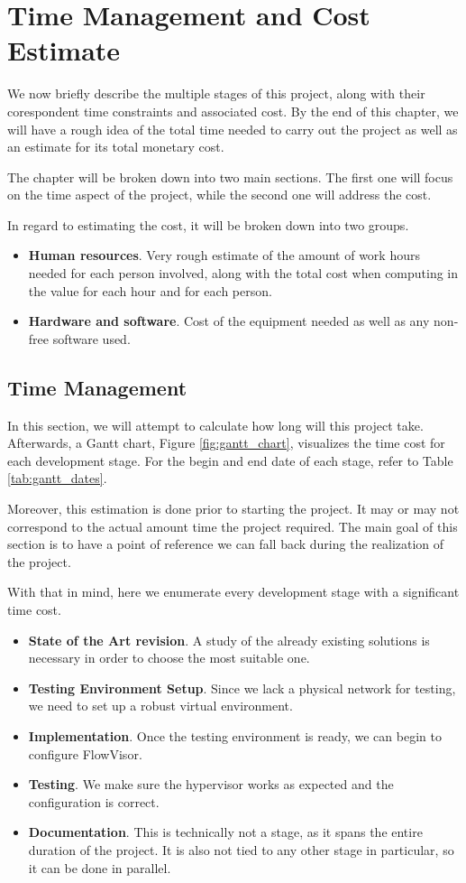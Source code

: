 \chapter{Time Management and Cost Estimate}
We now briefly describe the multiple stages of this project, along with their corespondent time constraints and associated cost. By the end of this chapter, we will have a rough idea of the total time needed to carry out the project as well as an estimate for its total monetary cost.

The chapter will be broken down into two main sections. The first one will focus on the time aspect of the project, while the second one will address the cost.

In regard to estimating the cost, it will be broken down into two groups.
\begin{itemize}
    \item \textbf{Human resources}. Very rough estimate of the amount of work hours needed for each person involved, along with the total cost when computing in the value for each hour and for each person.
    \item \textbf{Hardware and software}. Cost of the equipment needed as well as any non-free software used.
\end{itemize}

\section{Time Management}
In this section, we will attempt to calculate how long will this project take. Afterwards, a Gantt chart, Figure \ref{fig:gantt_chart}, visualizes the time cost for each development stage. For the begin and end date of each stage, refer to Table \ref{tab:gantt_dates}.

Moreover, this estimation is done prior to starting the project. It may or may not correspond to the actual amount time the project required. The main goal of this section is to have a point of reference we can fall back during the realization of the project.

With that in mind, here we enumerate every development stage with a significant time cost.
\begin{itemize}
    \item \textbf{State of the Art revision}. A study of the already existing solutions is necessary in order to choose the most suitable one.
    \item \textbf{Testing Environment Setup}. Since we lack a physical network for testing, we need to set up a robust virtual environment. 
    \item \textbf{Implementation}. Once the testing environment is ready, we can begin to configure FlowVisor.
    \item \textbf{Testing}. We make sure the hypervisor works as expected and the configuration is correct.
    \item \textbf{Documentation}. This is technically not a stage, as it spans the entire duration of the project. It is also not tied to any other stage in particular, so it can be done in parallel.
\end{itemize}

